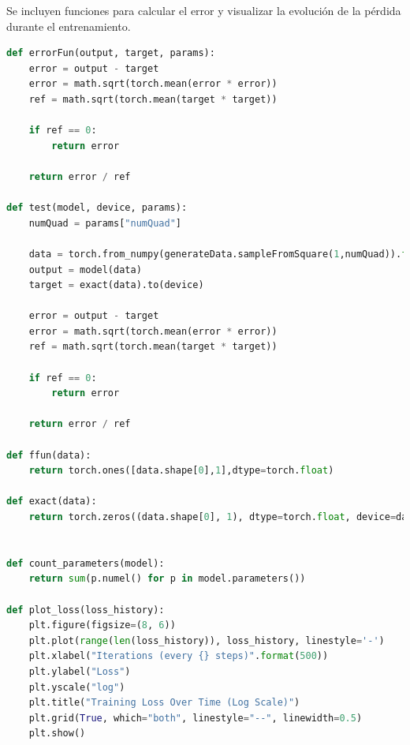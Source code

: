 \documentclass[a4paper,11pt,spanish, twoside, leqno]{tfg-uam}
\theoremstyle{definition}
\begin{document}
Se incluyen funciones para calcular el error y visualizar la evolución de la pérdida durante el entrenamiento.

\begin{lstlisting}[language=Python]
def errorFun(output, target, params):
    error = output - target
    error = math.sqrt(torch.mean(error * error))
    ref = math.sqrt(torch.mean(target * target))
    
    if ref == 0:  
        return error  
    
    return error / ref  

def test(model, device, params):
    numQuad = params["numQuad"]

    data = torch.from_numpy(generateData.sampleFromSquare(1,numQuad)).float().to(device)
    output = model(data)
    target = exact(data).to(device)

    error = output - target
    error = math.sqrt(torch.mean(error * error))
    ref = math.sqrt(torch.mean(target * target))

    if ref == 0:  
        return error  

    return error / ref

def ffun(data):
    return torch.ones([data.shape[0],1],dtype=torch.float)

def exact(data):
    return torch.zeros((data.shape[0], 1), dtype=torch.float, device=data.device)


def count_parameters(model):
    return sum(p.numel() for p in model.parameters())

def plot_loss(loss_history):
    plt.figure(figsize=(8, 6))
    plt.plot(range(len(loss_history)), loss_history, linestyle='-')
    plt.xlabel("Iterations (every {} steps)".format(500))
    plt.ylabel("Loss")
    plt.yscale("log")  
    plt.title("Training Loss Over Time (Log Scale)")
    plt.grid(True, which="both", linestyle="--", linewidth=0.5)  
    plt.show()
\end{lstlisting}
\end{document}
